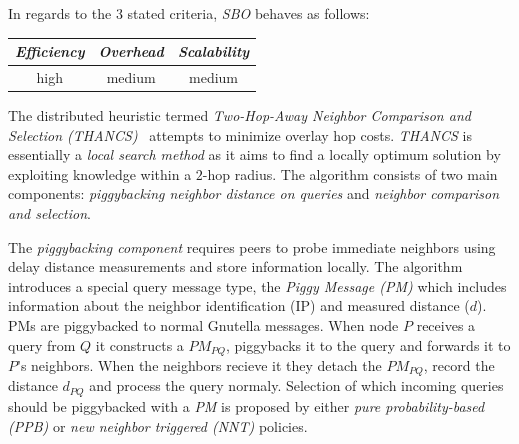 %
%
In regards to the $3$ stated criteria, \emph{SBO} behaves as follows:
\begin{center}
{\footnotesize
\begin{tabular}{ccc}
\emph{Efficiency} & \emph{Overhead} & \emph{Scalability} \\
\hline
high &
medium &
%
medium
\end{tabular}
}
\end{center}


The distributed heuristic termed 
\emph{Two-Hop-Away Neighbor Comparison and Selection (THANCS)}~\cite{LNXE2005,L2008}
attempts to minimize overlay hop costs.
\emph{THANCS} is essentially a \emph{local search method} as it aims 
to find a locally optimum solution by exploiting knowledge within 
a $2$-hop radius. The algorithm consists of two main components:
\emph{piggybacking neighbor distance on queries} and
\emph{neighbor comparison and selection}.

The \emph{piggybacking component} requires peers 
to probe immediate neighbors using delay distance measurements 
and store information locally. The algorithm introduces a special query message
type, the \emph{Piggy Message (PM)} which includes information about 
the neighbor identification (IP) and measured distance ($d$). PMs are
piggybacked to normal
Gnutella messages. When node $P$ receives a query from $Q$ it constructs a
$PM_{PQ}$, piggybacks it to the query and forwards it to $P$'s neighbors. When
the neighbors recieve it they detach the $PM_{PQ}$, record the distance
$d_{PQ}$ and process the query normaly. Selection of which incoming queries
should be piggybacked with a \emph{PM} is proposed by either
\emph{pure probability-based (PPB)} or \emph{new neighbor triggered (NNT)}
policies.

